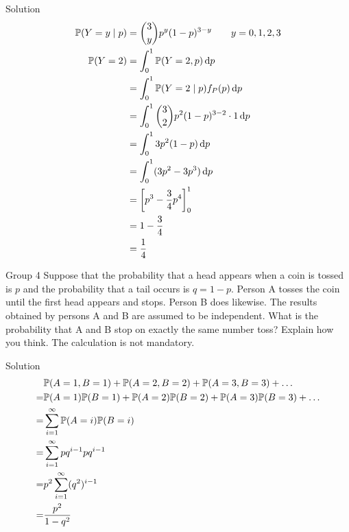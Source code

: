 \documentclass{article}
\begin{document}
\begin{solution}
    {Solution}
    \begin{align*}
        \condP{Y=y}{p}
        &= \binom{3}{y}p^y(1-p)^{3-y} \qquad y=0,1,2,3 \\
        \P{Y=2}
        &= \int_{0}^{1} \P{Y=2, p}\diff p \\
        &= \int_{0}^{1}\condP{Y=2}{p}f_P(p)\diff p \\
        &= \int_{0}^{1}\binom{3}{2}p^2(1-p)^{3-2}\cdot 1\diff p \\
        &= \int_{0}^{1}3p^2(1-p)\diff p \\
        &= \int_{0}^{1}(3p^2-3p^3)\diff p \\
        &= \left[p^3-\frac{3}{4}p^4\right]_{0}^{1} \\
        &= 1-\frac{3}{4} \\
        &= \frac{1}{4}
    \end{align*}
\end{solution}

\begin{problem}
    {Group 4}
    Suppose that the probability that a head appears when a coin is tossed is $p$ and the probability that a tail occurs is $q = 1 - p$. Person A tosses the coin until the first head appears and stops. Person B does likewise. The results obtained by persons A and B are assumed to be independent. What is the probability that A and B stop on exactly the same number toss? Explain how you think. The calculation is not mandatory.
\end{problem}

\begin{solution}
    {Solution}
    \begin{align*}
        &\P{A=1,B=1}+\P{A=2,B=2}+\P{A=3,B=3}+\ldots \\
        = &\P{A=1}\P{B=1}+\P{A=2}\P{B=2}+\P{A=3}\P{B=3}+\ldots \\
        = &\sum_{i=1}^{\infty}\P{A=i}\P{B=i} \\
        = &\sum_{i=1}^{\infty}pq^{i-1}pq^{i-1} \\
        = &p^2\sum_{i=1}^{\infty}(q^2)^{i-1} \\
        = &\frac{p^2}{1-q^2}
    \end{align*}
\end{solution}
\end{document}
